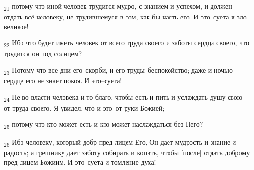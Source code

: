 \begin{tcolorbox}
\textsubscript{21} потому что иной человек трудится мудро, с знанием и успехом, и должен отдать всё человеку, не трудившемуся в том, как бы часть его. И это--суета и зло великое!
\end{tcolorbox}
\begin{tcolorbox}
\textsubscript{22} Ибо что будет иметь человек от всего труда своего и заботы сердца своего, что трудится он под солнцем?
\end{tcolorbox}
\begin{tcolorbox}
\textsubscript{23} Потому что все дни его--скорби, и его труды--беспокойство; даже и ночью сердце его не знает покоя. И это--суета!
\end{tcolorbox}
\begin{tcolorbox}
\textsubscript{24} Не во власти человека и то благо, чтобы есть и пить и услаждать душу свою от труда своего. Я увидел, что и это--от руки Божией;
\end{tcolorbox}
\begin{tcolorbox}
\textsubscript{25} потому что кто может есть и кто может наслаждаться без Него?
\end{tcolorbox}
\begin{tcolorbox}
\textsubscript{26} Ибо человеку, который добр пред лицем Его, Он дает мудрость и знание и радость; а грешнику дает заботу собирать и копить, чтобы [после] отдать доброму пред лицем Божиим. И это--суета и томление духа!
\end{tcolorbox}
